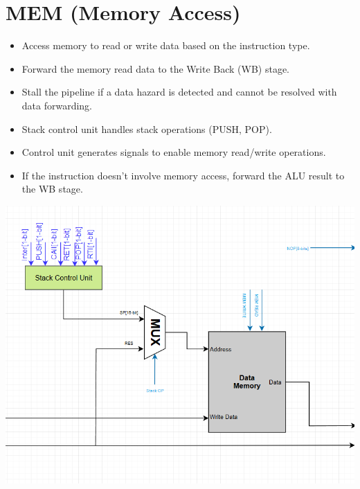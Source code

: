 \documentclass{report}
\begin{document}
\section*{MEM (Memory Access)}
\begin{minipage}{0.6\textwidth}
\begin{itemize}
    \item Access memory to read or write data based on the instruction type.
    \item Forward the memory read data to the Write Back (WB) stage.
    \item Stall the pipeline if a data hazard is detected and cannot be resolved with data forwarding.
    \item Stack control unit handles stack operations (PUSH, POP).
    \item Control unit generates signals to enable memory read/write operations.
    \item If the instruction doesn't involve memory access, forward the ALU result to the WB stage.
\end{itemize}
\end{minipage}
\begin{minipage}{0.35\textwidth}
\begin{center}
    \includegraphics[width=\textwidth]{./assets/MEM.png}
\end{center}
\end{minipage}
\end{document}
